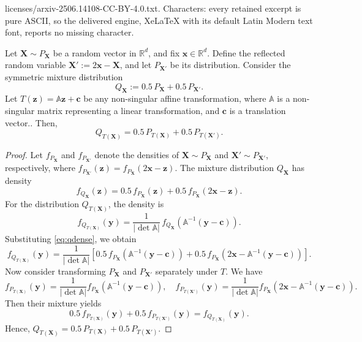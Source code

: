 \documentclass[10pt,a4paper]{amsart}
\newcommand{\vecX}{\mathbf{X}}
\newcommand{\vecc}{\mathbf{c}}
\newcommand{\vecx}{\mathbf{x}}
\newcommand{\vecy}{\mathbf{y}}
\newcommand{\vecz}{\mathbf{z}}
\begin{document}
licenses/arxiv-2506.14108-CC-BY-4.0.txt. Characters: every retained excerpt is pure ASCII, so the delivered engine, XeLaTeX with its default Latin Modern text font, reports no missing character.
\begin{lemma}
\label{lem:affine_mixture}
Let $\vecX \sim P_{\vecX}$ be a random vector in $\mathbb{R}^d$, and fix $\vecx \in \mathbb{R}^d$. Define the reflected random variable $\vecX' := 2\vecx - \vecX$, and let $P_{\vecX'}$ be its distribution. Consider the symmetric mixture distribution
\[
Q_{\vecX} := 0.5\, P_{\vecX} + 0.5\, P_{\vecX'}.
\]
Let $T(\vecz) = \mathbb{A} \vecz + \vecc$ be any non-singular affine transformation, where $ \mathbb{A} $ is a non-singular matrix representing a linear transformation, and $ \vecc $ is a translation vector.. Then,
\[
Q_{T(\vecX)} = 0.5\, P_{T(\vecX)} + 0.5\, P_{T(\vecX')}.
\]
\end{lemma}

\begin{proof}
Let $f_{P_{\vecX}}$ and $f_{P_{\vecX'}}$ denote the densities of $\vecX \sim P_{\vecX}$ and $\vecX' \sim P_{\vecX'}$, respectively, where $f_{P_{\vecX'}}(\vecz) = f_{P_{\vecX}}(2\vecx - \vecz)$. The mixture distribution $Q_{\vecX}$ has density
\begin{equation}\label{eq:qdense}
f_{Q_{\vecX}}(\vecz) = 0.5\, f_{P_{\vecX}}(\vecz) + 0.5\, f_{P_{\vecX}}(2\vecx - \vecz).
\end{equation}
For the distribution $Q_{T(\vecX)}$, the density is
\[
f_{Q_{T(\vecX)}}(\vecy) = \frac{1}{|\det \mathbb{A}|}\, f_{Q_{\vecX}}(\mathbb{A}^{-1}(\vecy - \vecc)).
\]
Substituting \eqref{eq:qdense}, we obtain
\[
f_{Q_{T(\vecX)}}(\vecy) = \frac{1}{|\det \mathbb{A}|} \left[ 0.5\, f_{P_{\vecX}}(\mathbb{A}^{-1}(\vecy - \vecc)) + 0.5\, f_{P_{\vecX}}(2\vecx - \mathbb{A}^{-1}(\vecy - \vecc)) \right].
\]
Now consider transforming $ P_\vecX $ and $ P_{\vecX'} $ separately under $ T $. We have
\[
f_{P_{T(\vecX)}}(\vecy) = \frac{1}{|\det \mathbb{A}|} f_{P_{\vecX}}(\mathbb{A}^{-1}(\vecy - \vecc)), \quad
f_{P_{T(\vecX')}}(\vecy) = \frac{1}{|\det \mathbb{A}|} f_{P_{\vecX}}(2\vecx - \mathbb{A}^{-1}(\vecy - \vecc)).
\]
Then their mixture yields
\[
0.5\, f_{P_{T(\vecX)}}(\vecy) + 0.5\, f_{P_{T(\vecX')}}(\vecy) = f_{Q_{T(\vecX)}}(\vecy).
\]
Hence,
$
Q_{T(\vecX)} = 0.5\, P_{T(\vecX)} + 0.5\, P_{T(\vecX')}.
$
\end{proof}
\end{document}
